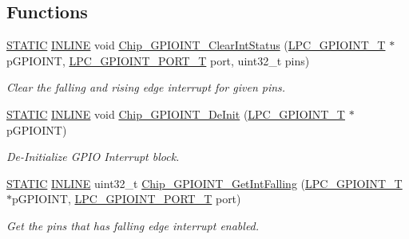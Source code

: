 \subsection*{Functions}
\begin{DoxyCompactItemize}
\item 
\hyperlink{group__LPC__Types__Public__Macros_ga10b2d890d871e1489bb02b7e70d9bdfb}{S\+T\+A\+T\+IC} \hyperlink{group__LPC__Types__Public__Types_ga2eb6f9e0395b47b8d5e3eeae4fe0c116}{I\+N\+L\+I\+NE} void \hyperlink{group__GPIOINT__17XX__40XX_ga900d1ac0c053f80c19fc01ae7fc5d981}{Chip\+\_\+\+G\+P\+I\+O\+I\+N\+T\+\_\+\+Clear\+Int\+Status} (\hyperlink{structLPC__GPIOINT__T}{L\+P\+C\+\_\+\+G\+P\+I\+O\+I\+N\+T\+\_\+T} $\ast$p\+G\+P\+I\+O\+I\+NT, \hyperlink{group__GPIOINT__17XX__40XX_ga41631ac5e33fde341c0afe680ded9fee}{L\+P\+C\+\_\+\+G\+P\+I\+O\+I\+N\+T\+\_\+\+P\+O\+R\+T\+\_\+T} port, uint32\+\_\+t pins)
\begin{DoxyCompactList}\small\item\em Clear the falling and rising edge interrupt for given {\itshape pins}. \end{DoxyCompactList}\item 
\hyperlink{group__LPC__Types__Public__Macros_ga10b2d890d871e1489bb02b7e70d9bdfb}{S\+T\+A\+T\+IC} \hyperlink{group__LPC__Types__Public__Types_ga2eb6f9e0395b47b8d5e3eeae4fe0c116}{I\+N\+L\+I\+NE} void \hyperlink{group__GPIOINT__17XX__40XX_ga469286ac9a7cf6065584e9f29dda2293}{Chip\+\_\+\+G\+P\+I\+O\+I\+N\+T\+\_\+\+De\+Init} (\hyperlink{structLPC__GPIOINT__T}{L\+P\+C\+\_\+\+G\+P\+I\+O\+I\+N\+T\+\_\+T} $\ast$p\+G\+P\+I\+O\+I\+NT)
\begin{DoxyCompactList}\small\item\em De-\/\+Initialize G\+P\+IO Interrupt block. \end{DoxyCompactList}\item 
\hyperlink{group__LPC__Types__Public__Macros_ga10b2d890d871e1489bb02b7e70d9bdfb}{S\+T\+A\+T\+IC} \hyperlink{group__LPC__Types__Public__Types_ga2eb6f9e0395b47b8d5e3eeae4fe0c116}{I\+N\+L\+I\+NE} uint32\+\_\+t \hyperlink{group__GPIOINT__17XX__40XX_ga151aaa1239b3f8b23be4c7c4238c7370}{Chip\+\_\+\+G\+P\+I\+O\+I\+N\+T\+\_\+\+Get\+Int\+Falling} (\hyperlink{structLPC__GPIOINT__T}{L\+P\+C\+\_\+\+G\+P\+I\+O\+I\+N\+T\+\_\+T} $\ast$p\+G\+P\+I\+O\+I\+NT, \hyperlink{group__GPIOINT__17XX__40XX_ga41631ac5e33fde341c0afe680ded9fee}{L\+P\+C\+\_\+\+G\+P\+I\+O\+I\+N\+T\+\_\+\+P\+O\+R\+T\+\_\+T} port)
\begin{DoxyCompactList}\small\item\em Get the pins that has falling edge interrupt enabled. \end{DoxyCompactList}\item 

\end{DoxyCompactItemize}
